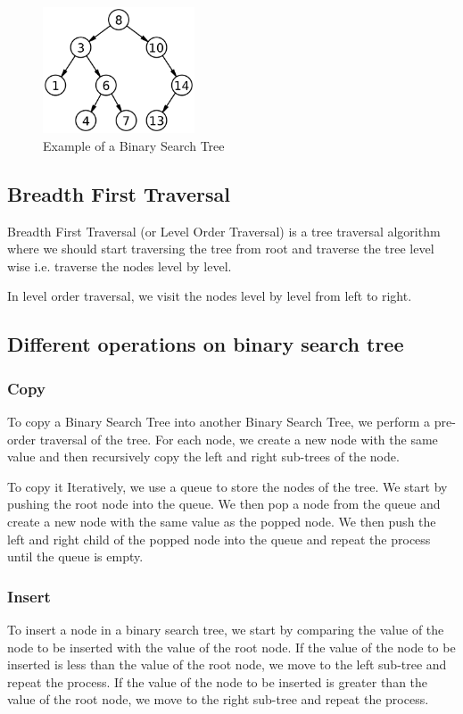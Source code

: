 \documentclass[11pt]{article}
\begin{document}
\begin{figure}[H]
	\centering
	\includegraphics[width=0.40\textwidth]{1200px-Binary_search_tree.svg.png}
	\caption{Example of a Binary Search Tree}
	\label{fig:1200px-Binary_search_tree.svg}
\end{figure}

\subsection{Breadth First Traversal}
Breadth First Traversal (or Level Order Traversal) is a tree traversal algorithm where we should start traversing the tree from root and traverse the tree level wise i.e. traverse the nodes level by level.

In level order traversal, we visit the nodes level by level from left to right.

\subsection{Different operations on binary search tree}

\subsubsection{Copy}
To copy a Binary Search Tree into another Binary Search Tree, we perform a pre-order traversal of the tree. For each node, we create a new node with the same value and then recursively copy the left and right sub-trees of the node.

To copy it Iteratively, we use a queue to store the nodes of the tree. We start by pushing the root node into the queue. We then pop a node from the queue and create a new node with the same value as the popped node. We then push the left and right child of the popped node into the queue and repeat the process until the queue is empty.

\subsubsection{Insert}
To insert a node in a binary search tree, we start by comparing the value of the node to be inserted with the value of the root node. If the value of the node to be inserted is less than the value of the root node, we move to the left sub-tree and repeat the process. If the value of the node to be inserted is greater than the value of the root node, we move to the right sub-tree and repeat the process.
\end{document}
